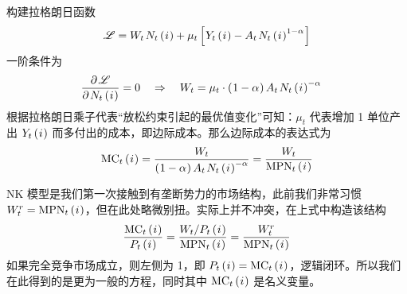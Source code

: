 构建拉格朗日函数
\begin{align*}
    \scr L=W_t\,N_t\bki+\mu_t\bks{Y_t\bki-A_t\,N_t\bki^{1-\alpha}}
\end{align*}
一阶条件为
\begin{align*}
    & \dfrac{\p \scr L}{\p N_t\bki}=0 \quad\Rightarrow\quad W_t=\mu_t\cdot\bka{1-\alpha}A_t\,N_t\bki^{-\alpha}
\end{align*}
根据拉格朗日乘子代表“放松约束引起的最优值变化”可知：\(\mu_t\) 代表增加 1 单位产出 \(Y_t\left(\mspace{1mu} i\mspace{1mu}\right)\) 而多付出的成本，即边际成本。那么边际成本的表达式为
\begin{align}
    \n{MC}_t\bki=\dfrac{W_t}{\bka{1-\alpha}A_t\,N_t\bki^{-\alpha}}=\dfrac{W_t}{\n{MPN}_t\bki}\label{eq:MC}
\end{align}

NK 模型是我们第一次接触到有垄断势力的市场结构，此前我们非常习惯 \(W_t^r=\text{MPN}_t\left(\mspace{1mu} i\mspace{1mu}\right)\)，但在此处略微别扭。实际上并不冲突，在上式中构造该结构
\begin{align}
    \dfrac{\text{MC}_t\left(\mspace{1mu} i\mspace{1mu}\right)}{P_t\left(\mspace{1mu} i\mspace{1mu}\right)}=\dfrac{W_t/P_t\left(\mspace{1mu} i\mspace{1mu}\right)}{\text{MPN}_t\left(\mspace{1mu} i\mspace{1mu}\right)}=\dfrac{W_t^r}{\text{MPN}_t\left(\mspace{1mu} i\mspace{1mu}\right)}\label{eq:MC-competitive}
\end{align}
如果完全竞争市场成立，则左侧为 1，即 \(P_t\left(\mspace{1mu} i\mspace{1mu}\right)=\text{MC}_t\left(\mspace{1mu} i\mspace{1mu}\right)\)，逻辑闭环。所以我们在此得到的是更为一般的方程，同时其中 \(\text{MC}_t\left(\mspace{1mu} i\mspace{1mu}\right)\) 是名义变量。


